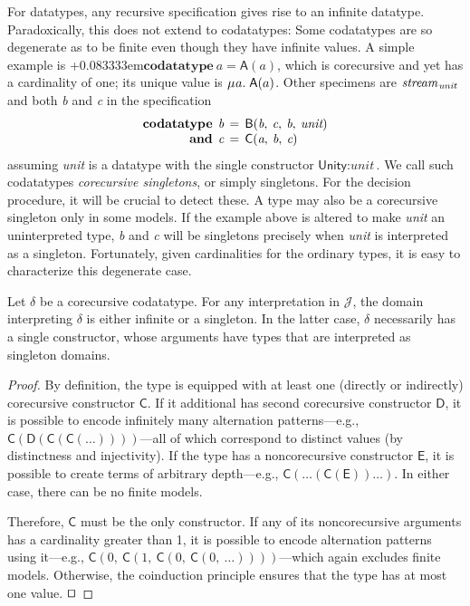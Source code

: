 \documentclass[smallcondensed,draft]{svjour3}
\newcommand\MU{\vvthinspace\mu\vvthinspace}
\newcommand\afterDot{\;} %
\newcommand\keyw[1]{\textbf{#1}}
\newcommand\const[1]{\textsf{#1}}
\newcommand\ty[1]{\textit{#1}}
\newcommand\xqed{{\hfill$\scriptstyle\squareforqed$}}
\newcommand{\JJJJ}{\mathcal{\!J\!}}
\newcommand\vvthinspace{\kern+0.041667em}
\newcommand\vthinspace{\kern+0.083333em}
\begin{document}
For datatypes, any recursive specification gives rise to an infinite datatype.
Paradoxically, this does not extend to codatatypes:
Some codatatypes are so degenerate as to be finite even though they
have infinite values. A simple example is
\vthinspace$\keyw{codatatype}~\ty{a} = \const{A}(\ty{a})$, which is corecursive
and yet has a cardinality of one;
its unique value is $\MU a.\; \const{A}(a)$. Other specimens are
$\ty{stream}_{\vthinspace\ty{unit}\,}$
and both \ty{b} and \ty{c} in the specification
\[\begin{aligned}[t]
      \keyw{codatatype}\;\, \ty{b} & \,=\, \const{B}(\ty{b},\: \ty{c},\: \ty{b},\: \ty{unit}) \\[-1\jot]
      \keyw{and}\;\, \ty{c} & \,=\, \const{C}(\ty{a},\: \ty{b},\: \ty{c})
\end{aligned}
\]
assuming \ty{unit} is a datatype with the single constructor $\const{Unity} :
\ty{unit}$. We call such codatatypes
\emph{corecursive singletons}, or simply singletons.
For the decision procedure, it will be
crucial to detect these. %
A type may also be a corecursive singleton only in some models. If the example
above is altered to make \ty{unit} an uninterpreted type, \ty{b} and \ty{c} will be
singletons precisely when \ty{unit} is interpreted as a singleton.
Fortunately, given cardinalities for the ordinary types,
it is easy to characterize this degenerate case.


\begin{lemma}%
\label{lem:corecursive-singletons}%
\afterDot
Let $\delta$ be a corecursive codatatype. For any interpretation in $\JJJJ$,
the domain interpreting $\delta$ is either infinite or a singleton. In the
latter case, $\delta$ necessarily has a single constructor, whose arguments have
types that are interpreted as singleton domains.
\end{lemma}

\begin{proof}
By definition, the type is equipped with at least one (directly or indirectly)
corecursive constructor $\const{C}$. If it additional has second
corecursive constructor $\const{D}$, it is possible to encode infinitely many
alternation patterns---e.g.,
$\const{C}(\const{D}(\const{C}(\const{C}(\ldots))))$---all of which correspond
to distinct values (by distinctness and injectivity). If the type has a
noncorecursive constructor $\const{E}$, it is possible to create terms of
arbitrary depth---e.g., $\const{C}(\ldots(\const{C}(\const{E}))\ldots)$. In
either case, there can be no finite models.

Therefore, $\const{C}$ must be the only constructor.
If any of its noncorecursive arguments has a cardinality greater than 1,
it is possible to encode alternation patterns using it---e.g.,
$\const{C}(0,\: \const{C}(1,\: \const{C}(0,\: \const{C}(0,\: \ldots))))$---which
again excludes finite models. Otherwise, the coinduction principle ensures
that the type has at most one value.
\xqed
\end{proof}
\end{document}
